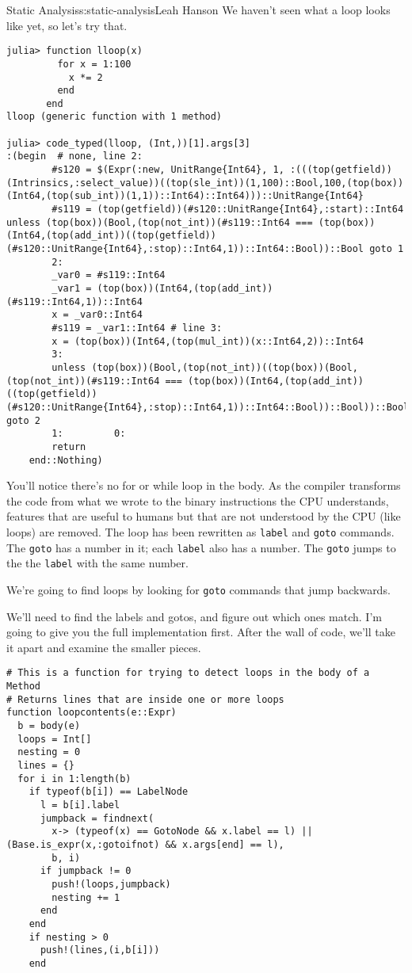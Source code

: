 \begin{aosachapter}{Static Analysis}{s:static-analysis}{Leah Hanson}
We haven't seen what a loop looks like yet, so let's try that.

\begin{verbatim}
julia> function lloop(x)
         for x = 1:100
           x *= 2
         end
       end
lloop (generic function with 1 method)

julia> code_typed(lloop, (Int,))[1].args[3]
:(begin  # none, line 2:
        #s120 = $(Expr(:new, UnitRange{Int64}, 1, :(((top(getfield))(Intrinsics,:select_value))((top(sle_int))(1,100)::Bool,100,(top(box))(Int64,(top(sub_int))(1,1))::Int64)::Int64)))::UnitRange{Int64}
        #s119 = (top(getfield))(#s120::UnitRange{Int64},:start)::Int64        unless (top(box))(Bool,(top(not_int))(#s119::Int64 === (top(box))(Int64,(top(add_int))((top(getfield))(#s120::UnitRange{Int64},:stop)::Int64,1))::Int64::Bool))::Bool goto 1
        2: 
        _var0 = #s119::Int64
        _var1 = (top(box))(Int64,(top(add_int))(#s119::Int64,1))::Int64
        x = _var0::Int64
        #s119 = _var1::Int64 # line 3:
        x = (top(box))(Int64,(top(mul_int))(x::Int64,2))::Int64
        3: 
        unless (top(box))(Bool,(top(not_int))((top(box))(Bool,(top(not_int))(#s119::Int64 === (top(box))(Int64,(top(add_int))((top(getfield))(#s120::UnitRange{Int64},:stop)::Int64,1))::Int64::Bool))::Bool))::Bool goto 2
        1:         0: 
        return
    end::Nothing)
\end{verbatim}

You'll notice there's no for or while loop in the body. As the compiler
transforms the code from what we wrote to the binary instructions the
CPU understands, features that are useful to humans but that are not
understood by the CPU (like loops) are removed. The loop has been
rewritten as \texttt{label} and \texttt{goto} commands. The
\texttt{goto} has a number in it; each \texttt{label} also has a number.
The \texttt{goto} jumps to the the \texttt{label} with the same number.

\label{detecting-and-extracting-loops}

We're going to find loops by looking for \texttt{goto} commands that
jump backwards.

We'll need to find the labels and gotos, and figure out which ones
match. I'm going to give you the full implementation first. After the
wall of code, we'll take it apart and examine the smaller pieces.

\begin{verbatim}
# This is a function for trying to detect loops in the body of a Method
# Returns lines that are inside one or more loops
function loopcontents(e::Expr)
  b = body(e)
  loops = Int[]
  nesting = 0
  lines = {}
  for i in 1:length(b)
    if typeof(b[i]) == LabelNode
      l = b[i].label
      jumpback = findnext(
        x-> (typeof(x) == GotoNode && x.label == l) || (Base.is_expr(x,:gotoifnot) && x.args[end] == l),
        b, i)
      if jumpback != 0
        push!(loops,jumpback)
        nesting += 1
      end
    end
    if nesting > 0
      push!(lines,(i,b[i]))
    end


\end{verbatim}
\end{aosachapter}
